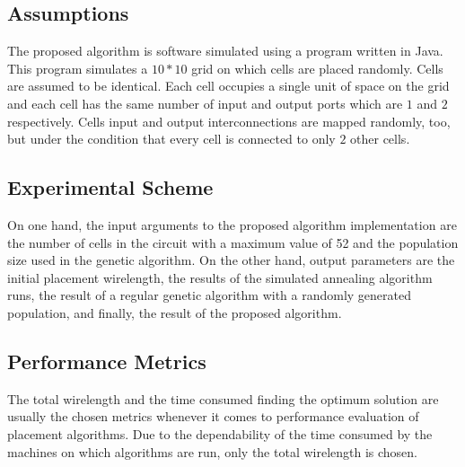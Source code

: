 \documentclass[conference]{IEEEtran}
\begin{document}
\subsection{Assumptions}

The proposed algorithm is software simulated using a program written in Java. This program simulates a $10*10$ grid on which cells are placed randomly. Cells are assumed to be identical. Each cell occupies a single unit of space on the grid and each cell has the same number of input and output ports which are $1$ and $2$ respectively. Cells input and output interconnections are mapped randomly, too, but under the condition that every cell is connected to only $2$ other cells.


\subsection{Experimental Scheme}

On one hand, the input arguments to the proposed algorithm implementation are the number of cells in the circuit with a maximum value of 52 and the population size used in the genetic algorithm. On the other hand, output parameters are the initial placement wirelength, the results of the simulated annealing algorithm runs, the result of a regular genetic algorithm with a randomly generated population, and finally, the result of the proposed algorithm.


\subsection{Performance Metrics}

The total wirelength and the time consumed finding the optimum solution are usually the chosen metrics whenever it comes to performance evaluation of placement algorithms. Due to the dependability of the time consumed by the machines on which algorithms are run, only the total wirelength is chosen.
\end{document}
